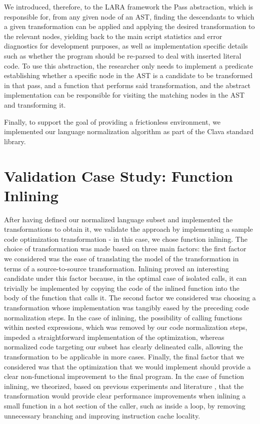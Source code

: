 We introduced, therefore, to the LARA framework the Pass abstraction, which is responsible for, from any given node of an AST, finding the descendants to which a given transformation can be applied and applying the desired transformation to the relevant nodes, yielding back to the main script statistics and error diagnostics for development purposes, as well as implementation specific details such as whether the program should be re-parsed to deal with inserted literal code. To use this abstraction, the researcher only needs to implement a predicate establishing whether a specific node in the AST is a candidate to be transformed in that pass, and a function that performs said transformation, and the abstract implementation can be responsible for visiting the matching nodes in the AST and transforming it.

Finally, to support the goal of providing a frictionless environment, we implemented our language normalization algorithm as part of the Clava standard library.

\section{Validation Case Study: Function Inlining}

After having defined our normalized language subset and implemented the transformations to obtain it, we validate the approach by implementing a sample code optimization transformation - in this case, we chose function inlining. The choice of transformation was made based on three main factors: the first factor we considered was the ease of translating the model of the transformation in terms of a source-to-source transformation. Inlining proved an interesting candidate under this factor because, in the optimal case of isolated calls, it can trivially be implemented by copying the code of the inlined function into the body of the function that calls it. The second factor we considered was choosing a transformation whose implementation was tangibly eased by the preceding code normalization steps. In the case of inlining, the possibility of calling functions within nested expressions, which was removed by our code normalization steps, impeded a straightforward implementation of the optimization, whereas normalized code targeting our subset has clearly delineated calls, allowing the transformation to be applicable in more cases. Finally, the final factor that we considered was that the optimization that we would implement should provide a clear non-functional improvement to the final program. In the case of function inlining, we theorized, based on previous experiments and literature \cite{Chen1993}, that the transformation would provide clear performance improvements when inlining a small function in a hot section of the caller, such as inside a loop, by removing unnecessary branching and improving instruction cache locality.

